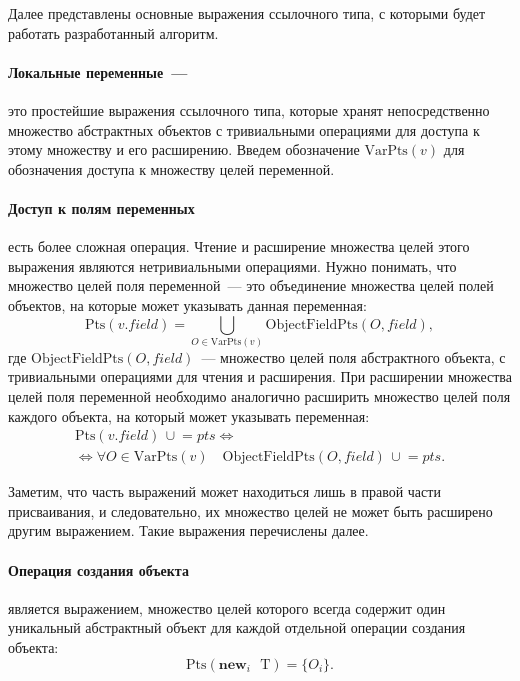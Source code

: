 \documentclass[14pt,titlepage]{extarticle}
\newcommand{\NEWi}[1]{\textbf{new}_{#1}\textbf{ }}
\newcommand{\Pts}[1]{\textrm{Pts}(#1)}
\newcommand{\VPts}[1]{\textrm{VarPts}(#1)}
\newcommand{\OFPts}[2]{\textrm{ObjectFieldPts}(#1, #2)}
\newcommand{\cupe}{\,\cup\!\!=}
\begin{document}
        Далее представлены основные выражения ссылочного типа, с которыми будет
        работать разработанный алгоритм.

        \paragraph{Локальные переменные~---} это простейшие выражения
        ссылочного типа, которые хранят непосредственно множество абстрактных
        объектов с тривиальными операциями для доступа к этому множеству и его
        расширению. Введем обозначение $\VPts{v}$ для обозначения доступа к
        множеству целей переменной.

        \paragraph{Доступ к полям переменных} есть более сложная операция.
        Чтение и расширение множества целей этого выражения являются
        нетривиальными операциями.
        Нужно понимать, что множество целей поля переменной~--- это объединение
        множества целей полей объектов, на которые может указывать данная
        переменная:
        \[\Pts{v.field} = \bigcup\limits_{O \in \VPts{v}} \OFPts{O}{field},\]
        где $\OFPts{O}{field}$~--- множество целей поля абстрактного объекта,
        с тривиальными операциями для чтения и расширения.
        При расширении множества целей поля переменной необходимо аналогично
        расширить множество целей поля каждого объекта, на который может
        указывать переменная:
        \begin{gather*}
          \Pts{v.field} \cupe pts
          \Leftrightarrow \\ \Leftrightarrow
          \forall O \in \VPts{v}\quad \OFPts{O}{field} \cupe pts.
        \end{gather*}

        Заметим, что часть выражений может находиться лишь в правой части
        присваивания, и следовательно, их множество целей не может быть
        расширено другим выражением. Такие выражения перечислены далее.

        \paragraph{Операция создания объекта} является выражением, множество
        целей которого всегда содержит один уникальный абстрактный объект для
        каждой отдельной операции создания объекта:
        \[\Pts{\NEWi{i} \textrm{T}} = \{O_i\}.\]
\end{document}
